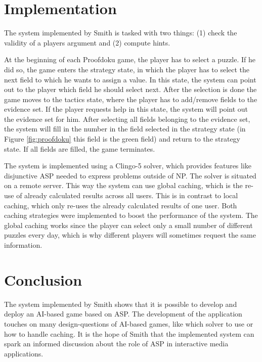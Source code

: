\documentclass[runningheads]{llncs}
\newcommand{\authorquote}{Smith}
\begin{document}
\section{Implementation} \label{sec:implementation}

The system implemented by \authorquote{} is tasked with two things: (1) check the validity of a players argument and (2) compute hints. 

At the beginning of each Proofdoku game, the player has to select a puzzle. If he did so, the game enters the strategy state, in which the player has to select the next field to which he wants to assign a value. In this state, the system can point out to the player which field he should select next. After the selection is done the game moves to the tactics state, where the player has to add/remove fields to the evidence set. If the player requests help in this state, the system will point out the evidence set for him. After selecting all fields belonging to the evidence set, the system will fill in the number in the field selected in the strategy state (in Figure \ref{fig:proofdoku} this field is the green field) and return to the strategy state. If all fields are filled, the game terminates. 

The system is implemented using a Clingo-5 solver, which provides features like disjunctive ASP \cite{gebser2013advanced} needed to express problems outside of NP. The solver is situated on a remote server. This way the system can use global caching, which is the re-use of already calculated results across all users. This is in contrast to local caching, which only re-uses the already calculated results of one user. Both caching strategies were implemented to boost the performance of the system. The global caching works since the player can select only a small number of different puzzles every day, which is why different players will sometimes request the same information. 



\section{Conclusion} \label{sec:conclusion}

The system implemented by \authorquote{} shows that it is possible to develop and deploy an AI-based game based on ASP. The development of the application touches on many design-questions of AI-based games, like which solver to use or how to handle caching. It is the hope of \authorquote{} that the implemented system can spark an informed discussion about the role of ASP in interactive media applications. 
\end{document}
